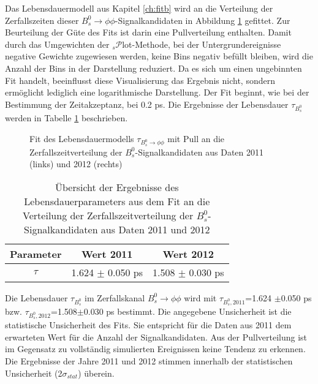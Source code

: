 \documentclass{article}
\begin{document}
Das Lebensdauermodell aus Kapitel \ref{ch:fitb} wird an die Verteilung der Zerfallszeiten dieser $B_s^0\rightarrow \phi\phi$-Signalkandidaten in Abbildung \ref{fig:tauData} gefittet. Zur Beurteilung der Güte des Fits ist darin eine Pullverteilung enthalten. Damit durch das Umgewichten der $_s\mathcal{P}$lot-Methode, bei der Untergrundereignisse negative Gewichte zugewiesen werden, keine Bins negativ befüllt bleiben, wird die Anzahl der Bins in der Darstellung reduziert. Da es sich um einen ungebinnten Fit handelt, beeinflusst diese Visualisierung das Ergebnis nicht, sondern ermöglicht lediglich eine logarithmische Darstellung. Der Fit beginnt, wie bei der Bestimmung der Zeitakzeptanz, bei 0.2 ps. Die Ergebnisse der Lebensdauer $\tau_{B_s^0}$ werden in Tabelle \ref{table:tauDataresults} beschrieben.

\label{ch:fit}
\begin{figure}[h!]
\caption{Fit des Lebensdauermodells $\tau_{B_s^0 \rightarrow \phi\phi}$ mit Pull an die Zerfallszeitverteilung der $B_s^0$-Signalkandidaten aus Daten 2011 (links) und 2012 (rechts)}

\label{fig:tauData}
\end{figure} 

\begin{table}[h!]
\noindent \begin{centering}\begin{tabular}{c|c|c}
Parameter & Wert 2011 & Wert 2012 \tabularnewline
\hline 
$\tau$ & 1.624 $\pm$ 0.050 ps& 1.508 $\pm$ 0.030 ps \tabularnewline
\end{tabular}
\par\end{centering}
\caption{Übersicht der Ergebnisse des Lebensdauerparameters aus dem Fit an die Verteilung der Zerfallszeitverteilung der $B_s^0$-Signalkandidaten aus Daten 2011 und 2012}
\label{table:tauDataresults}
\end{table}

Die Lebensdauer $\tau_{B_s^0}$ im Zerfallskanal $B_s^0 \rightarrow \phi \phi$ wird mit $\tau_{B_s^0,2011}$=1.624 $\pm$0.050 ps bzw. $\tau_{B_s^0,2012}$=1.508$\pm$0.030 ps bestimmt. Die angegebene Unsicherheit ist die statistische Unsicherheit des Fits. Sie entspricht für die Daten aus 2011 dem erwarteten Wert für die Anzahl der Signalkandidaten. Aus der Pullverteilung ist im Gegensatz zu vollständig simulierten Ereignissen keine Tendenz zu erkennen. Die Ergebnisse der Jahre 2011 und 2012 stimmen innerhalb der statistischen Unsicherheit (2$\sigma_{stat}$) überein.  
\end{document}
